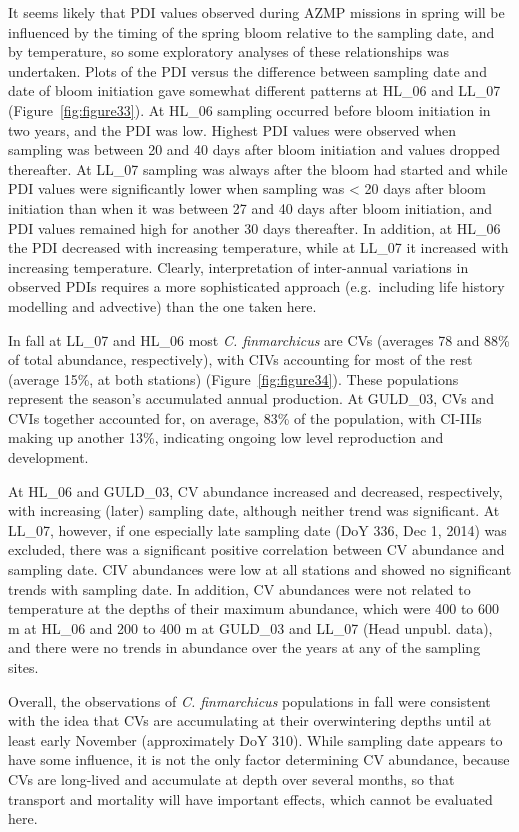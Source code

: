 \documentclass[12pt]{article}\usepackage[]{graphicx}\usepackage[]{color}
\begin{document}
It seems likely that PDI values observed during AZMP missions in spring will be influenced by the timing of the spring bloom relative to the sampling date, and by temperature, so some exploratory analyses of these relationships was undertaken. Plots of the PDI versus the difference between sampling date and date of bloom initiation gave somewhat different patterns at HL\_06 and LL\_07 (Figure~\ref{fig:figure33}). At HL\_06 sampling occurred before bloom initiation in two years, and the PDI was low. Highest PDI values were observed when sampling was between 20 and 40 days after bloom initiation and values dropped thereafter. At LL\_07 sampling was always after the bloom had started and while PDI values were significantly lower when sampling was \textless{} 20 days after bloom initiation than when it was between 27 and 40 days after bloom initiation, and PDI values remained high for another 30 days thereafter. In addition, at HL\_06 the PDI decreased with increasing temperature, while at LL\_07 it increased with increasing temperature. Clearly, interpretation of inter-annual variations in observed PDIs requires a more sophisticated approach (e.g.~including life history modelling and advective) than the one taken here.

In fall at LL\_07 and HL\_06 most \emph{C. finmarchicus} are CVs (averages 78 and 88\% of total abundance, respectively), with CIVs accounting for most of the rest (average 15\%, at both stations) (Figure~\ref{fig:figure34}). These populations represent the season's accumulated annual production. At GULD\_03, CVs and CVIs together accounted for, on average, 83\% of the population, with CI-IIIs making up another 13\%, indicating ongoing low level reproduction and development.

At HL\_06 and GULD\_03, CV abundance increased and decreased, respectively, with increasing (later) sampling date, although neither trend was significant. At LL\_07, however, if one especially late sampling date (DoY 336, Dec 1, 2014) was excluded, there was a significant positive correlation between CV abundance and sampling date. CIV abundances were low at all stations and showed no significant trends with sampling date. In addition, CV abundances were not related to temperature at the depths of their maximum abundance, which were 400 to 600 m at HL\_06 and 200 to 400 m at GULD\_03 and LL\_07 (Head unpubl. data), and there were no trends in abundance over the years at any of the sampling sites.

Overall, the observations of \emph{C. finmarchicus} populations in fall were consistent with the idea that CVs are accumulating at their overwintering depths until at least early November (approximately DoY 310). While sampling date appears to have some influence, it is not the only factor determining CV abundance, because CVs are long-lived and accumulate at depth over several months, so that transport and mortality will have important effects, which cannot be evaluated here.
\end{document}
